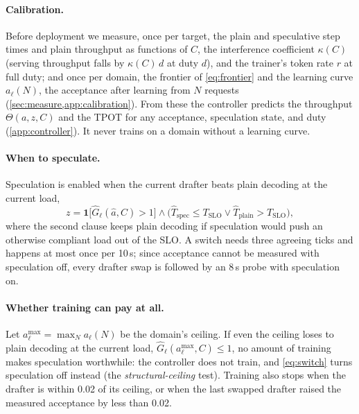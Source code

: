 \documentclass{article}
\newcommand{\Ghat}{\widehat{G}}
\newcommand{\amax}{a^{\max}}
\newcommand{\Tslo}{T_{\mathrm{SLO}}}
\begin{document}
\paragraph{Calibration.} Before deployment we measure, once per target, the plain and speculative step times and plain throughput as functions of $C$, the interference coefficient $\kappa(C)$ (serving throughput falls by $\kappa(C)\,d$ at duty $d$), and the trainer's token rate $r$ at full duty; and once per domain, the frontier of \cref{eq:frontier} and the learning curve $a_\ell(N)$, the acceptance after learning from $N$ requests (\cref{sec:measure,app:calibration}). From these the controller predicts the throughput $\Theta(a,z,C)$ and the TPOT for any acceptance, speculation state, and duty (\cref{app:controller}). It never trains on a domain without a learning curve.

\paragraph{When to speculate.} Speculation is enabled when the current drafter beats plain decoding at the current load,
\begin{equation}
z=\mathbf{1}\big[\Ghat_\ell(\hat a,C)>1\big]\wedge\big(\widehat T_{\mathrm{spec}}\le\Tslo\vee\widehat T_{\mathrm{plain}}>\Tslo\big),\label{eq:switch}
\end{equation}
where the second clause keeps plain decoding if speculation would push an otherwise compliant load out of the SLO. A switch needs three agreeing ticks and happens at most once per 10\,s; since acceptance cannot be measured with speculation off, every drafter swap is followed by an 8\,s probe with speculation on.

\paragraph{Whether training can pay at all.} Let $\amax_\ell=\max_N a_\ell(N)$ be the domain's ceiling. If even the ceiling loses to plain decoding at the current load, $\Ghat_\ell(\amax_\ell,C)\le1$, no amount of training makes speculation worthwhile: the controller does not train, and \cref{eq:switch} turns speculation off instead (the \emph{structural-ceiling} test). Training also stops when the drafter is within 0.02 of its ceiling, or when the last swapped drafter raised the measured acceptance by less than 0.02.
\end{document}
